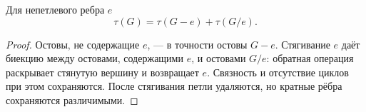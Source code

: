 

\begin{cor}
Для непетлевого ребра \(e\)
\[
\tau(G)=\tau(G-e)+\tau(G/e).
\]
\end{cor}
\begin{proof}
Остовы, не содержащие \(e\), — в точности остовы \(G-e\).
Стягивание \(e\) даёт биекцию между остовами, содержащими \(e\),
и остовами \(G/e\): обратная операция раскрывает стянутую вершину
и возвращает \(e\). Связность и отсутствие циклов при этом сохраняются.
После стягивания петли удаляются, но кратные рёбра сохраняются различимыми.
\end{proof}
